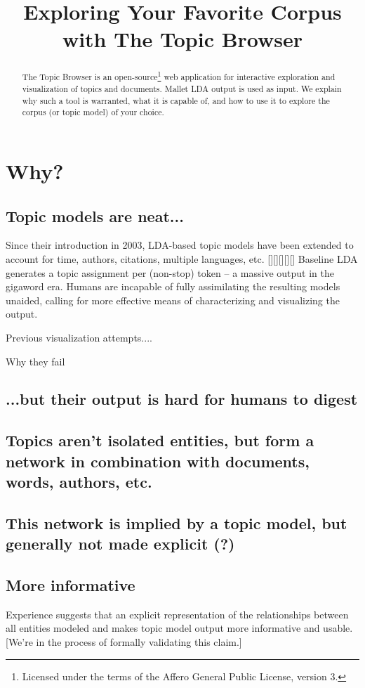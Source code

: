 \documentclass[a4paper,10pt]{article}
\title{Exploring Your Favorite Corpus with The Topic Browser}
\begin{document}
\maketitle

\begin{abstract}
The Topic Browser is an open-source\footnote{Licensed under the terms of the
Affero General Public License, version 3.}  web application for interactive
exploration and visualization of topics and documents. Mallet LDA output is used
as input. We explain why such a tool is warranted, what it is capable of, and
how to use it to explore the corpus (or topic model) of your choice.
\end{abstract}

\section{Why?}
\subsection{Topic models are neat...}
Since their introduction in 2003, LDA-based topic models have been extended to
account for time, authors, citations, multiple languages, etc. [][][][][]
Baseline LDA generates a topic assignment per (non-stop) token -- a massive
output in the gigaword era. Humans are incapable of fully assimilating the
resulting models unaided, calling for more effective means of characterizing and
visualizing the output. 

Previous visualization attempts....

Why they fail





\subsection{...but their output is hard for humans to digest}
\subsection{Topics aren't isolated entities, but form a network in combination
with documents, words, authors, etc.}
\subsection{This network is implied by a topic model, but generally not made
explicit (?)}
\subsection{More informative}
Experience suggests that an explicit representation of the relationships between
all entities modeled and makes topic model output more informative and usable.
[We're in the process of formally validating this claim.]
\end{document}

